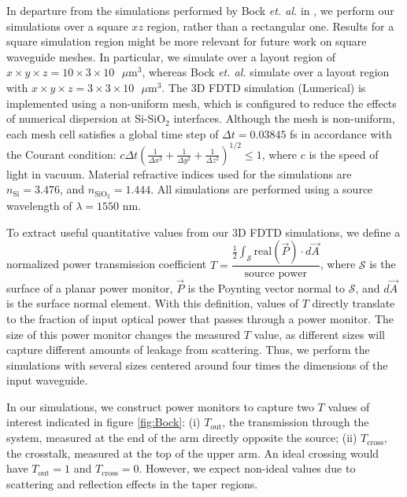 \documentclass[aps,prl,twocolumn, superscriptaddress]{revtex4}
\begin{document}
In departure from the simulations performed by Bock \textit{et. al.} in \cite{BockPaper}, we perform our simulations over a square $xz$ region, rather than a rectangular one. Results for a square simulation region might be more relevant for future work on square waveguide meshes. In particular, we simulate over a layout region of $x\times y\times z = 10 \times 3 \times 10 \text{ }\mu\text{m}^3$, whereas Bock \textit{et. al.} simulate over a layout region with $x\times y\times z = 3 \times 3 \times 10 \text{ }\mu\text{m}^3$. The 3D FDTD simulation (Lumerical) is implemented using a non-uniform mesh, which is configured to reduce the effects of numerical dispersion at Si-SiO$_2$ interfaces. Although the mesh is non-uniform, each mesh cell satisfies a global time step of $\Delta t= 0.03845$ fs in accordance with the Courant condition: $c\Delta t\left(\frac{1}{\Delta x^{2}} + \frac{1}{\Delta y^2} + \frac{1}{\Delta z^2}\right)^{1/2} \leq 1$, where $c$ is the speed of light in vacuum. Material refractive indices used for the simulations are $n_{\text{Si}} = 3.476$, and $n_{\text{SiO}_2} = 1.444$. All simulations are performed using a source wavelength of $\lambda = 1550$ nm.

To extract useful quantitative values from our 3D FDTD simulations, we define a normalized power transmission coefficient $T = \dfrac{\frac{1}{2}\int_\mathcal{S}\text{real}(\overrightarrow{P})\cdot d\overrightarrow{A}}{\text{source power}}$, where $\mathcal{S}$ is the surface of a planar power monitor, $\overrightarrow{P}$ is the Poynting vector normal to $\mathcal{S}$, and $d\overrightarrow{A}$ is the surface normal element. With this definition, values of $T$ directly translate to the fraction of input optical power that passes through a power monitor. The size of this power monitor changes the measured $T$ value, as different sizes will capture different amounts of leakage from scattering. Thus, we perform the simulations with several sizes centered around four times the dimensions of the input waveguide. 

In our simulations, we construct power monitors to capture two $T$ values of interest indicated in figure \ref{fig:Bock}: (i) $T_{\text{out}}$, the transmission through the system, measured at the end of the arm directly opposite the source; (ii) $T_{\text{cross}}$, the crosstalk, measured at the top of the upper arm. An ideal crossing would have $T_{\text{out}}=1$ and $T_{\text{cross}} = 0$. However, we expect non-ideal values due to scattering and reflection effects in the taper regions. 
\end{document}
